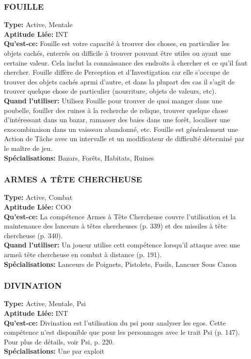 \subsubsection{FOUILLE} \textbf{Type:} Active, Mentale \\ \textbf{Aptitude Liée:} INT \\ \textbf{Qu'est-ce:} Fouille est votre capacité à trouver des choses, en particulier les objets cachés, enterrés ou difficile à trouver  pouvant être utiles ou ayant une certaine valeur. Cela inclut la connaissance des endroits à chercher et ce qu'il faut chercher. Fouille diffère de Perception et d'Investigation car elle s'occupe de trouver des objets cachés aprmi d'autre, et dans la plupart des cas il s'agit de trouver quelque chose de particulier (nourriture, objets de valeurs, etc). \\ \textbf{Quand l'utiliser:} Utilisez Fouille pour trouver de quoi manger dans une poubelle, fouiller des ruines à la recherche de relique, trouver quelque chose d'intéressant dans un bazar, ramasser des baies dans une forêt, localiser une exocombinaison dans un vaisseau abandonné, etc. Fouille est généralement une Action de Tâche avec un intervalle et un modificateur de difficulté déterminé par le maître de jeu. \\ \textbf{Spécialisations:} Bazars, Forêts, Habitats, Ruines 

\subsubsection{ARMES A TÊTE CHERCHEUSE} \textbf{Type:} Active, Combat \\ \textbf{Aptitude Liée:} COO \\ \textbf{Qu'est-ce:} La compétence Armes à Tête Chercheuse couvre l'utilisation et la maintenance des lanceurs à têtes chercheuses  (p. 339) et des missiles à tête chercheuse (p. 340). \\ \textbf{Quand l'utiliser:} Un joueur utilise cett compétence lorsqu'il attaque avec une armeà tête chercheuse en combat à distance (p. 191). \\ \textbf{Spécialisations:} Lanceurs de Poignets, Pistolets, Fusils, Lancuer Sous Canon 

\subsubsection{DIVINATION} \textbf{Type:} Active, Mentale, Psi \\ \textbf{Aptitude Liée:} INT \\ \textbf{Qu'est-ce:} Divination est l'utilisation du psi pour analyser les egos. Cette compétence n'est disponible que pour les personnages avec le trait Psi (p. 147). Pour plus de détails, voir Psi, p. 220. \\ \textbf{Spécialisations:} Une par exploit 


